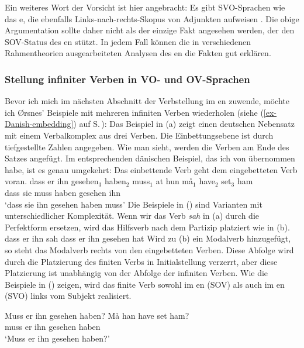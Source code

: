 Ein weiteres Wort der Vorsicht ist hier angebracht: Es gibt SVO-Sprachen wie das e, die ebenfalls Links-nach-rechts-Skopus von Adjunkten aufweisen \citep[--161]{BGK2004a-u}. Die obige Argumentation sollte daher nicht als der einzige
Fakt angesehen werden, der den SOV-Status des en stützt. In jedem Fall können die in verschiedenen Rahmentheorien
ausgearbeiteten Analysen des en die Fakten gut erklären.

\subsubsection{Stellung infiniter Verben in VO- und OV-Sprachen}

Bevor ich mich im nächsten Abschnitt der Verbstellung im en zuwende, möchte ich Ørsnes'
Beispiele mit mehreren infiniten Verben wiederholen (siehe (\ref{ex-Danish-embedding}) auf S.\,\pageref{ex-Danish-embedding}): Das Beispiel in (a) zeigt einen deutschen Nebensatz mit einem Verbalkomplex aus
drei Verben. Die Einbettungsebene ist durch tiefgestellte Zahlen angegeben. Wie man sieht, werden die Verben
am Ende des Satzes angefügt. Im entsprechenden dänischen Beispiel, das ich von
\citet[]{Oersnes2009b} übernommen habe, ist es genau umgekehrt:
Das einbettende Verb geht dem eingebetteten Verb voran.
\eal
\ex
 dass er ihn gesehen$_3$ haben$_2$ muss$_1$
\ex
\gll at hun må$_1$ have$_2$ set$_3$ ham\\
     dass sie muss haben gesehen ihn\\\danish
\glt `dass sie ihn gesehen haben muss'
\zl
%
Die Beispiele in () sind Varianten mit unterschiedlicher Komplexität. Wenn wir das Verb
\emph{sah} in (a) durch die Perfektform ersetzen, wird das Hilfsverb nach dem Partizip platziert wie
in (b).
\eal
\ex
dass er ihn sah
\ex
dass er ihn gesehen hat
\zl 
Wird zu (b) ein Modalverb hinzugefügt, so steht das Modalverb rechts von den eingebetteten Verben. Diese Abfolge wird
durch die Platzierung des finiten Verbs in Initialstellung verzerrt, aber diese Platzierung ist unabhängig
von der Abfolge der infiniten Verben. Wie die Beispiele in () zeigen, wird das finite Verb
sowohl im en (SOV) als auch im en (SVO) links vom Subjekt realisiert.

\eal
\ex 
 Muss er ihn gesehen haben?
\ex 
\gll Må han have set ham?\\
     muss er ihn gesehen haben\\\danish
\glt `Muss er ihn gesehen haben?'
\zl
{}

